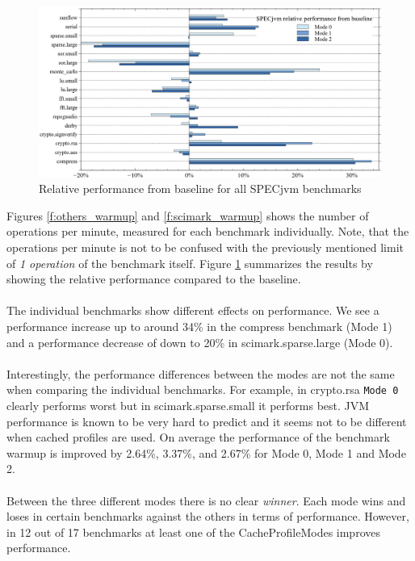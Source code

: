 \begin{figure}[ht]
  \begin{center}
    \centering
    \includegraphics[width=1.0\textwidth]{figures/all_warmup_variation.png}
    \caption{Relative performance from baseline for all SPECjvm benchmarks}
    \label{f:all_warmup_variation}
  \end{center}
\end{figure}
Figures \ref{f:others_warmup} and \ref{f:scimark_warmup} shows the number of operations per minute, measured for each benchmark individually. Note, that the operations per minute is not to be confused with the previously mentioned limit of \textit{1 operation} of the benchmark itself.
Figure \ref{f:all_warmup_variation} summarizes the results by showing the relative performance compared to the baseline.
\\\\
The individual benchmarks show different effects on performance. We see a performance increase up to around 34\% in the compress benchmark (Mode 1) and a performance decrease of down to 20\% in scimark.sparse.large (Mode 0).
\\\\
Interestingly, the performance differences between the modes are not the same when comparing the individual benchmarks. For example, in crypto.rsa \texttt{Mode 0} clearly performs worst but in scimark.sparse.small it performs best.
JVM performance is known to be very hard to predict and it seems not to be different when cached profiles are used. On average the performance of the benchmark warmup is improved by 2.64\%, 3.37\%, and 2.67\% for Mode 0, Mode 1 and Mode 2.
\\\\
Between the three different modes there is no clear \textit{winner}. Each mode wins and loses in certain benchmarks against the others in terms of performance. However, in 12 out of 17 benchmarks at least one of the CacheProfileModes improves performance. 
